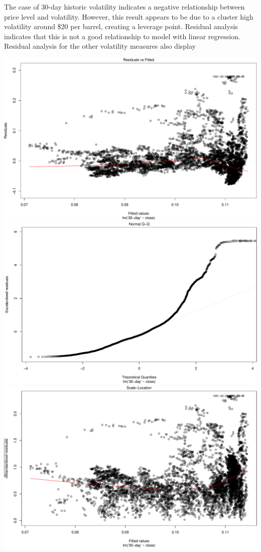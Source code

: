 \documentclass[11pt,]{article}
\makeatletter
\def\maxwidth{\ifdim\Gin@nat@width>\linewidth\linewidth
\else\Gin@nat@width\fi}
\let\Oldincludegraphics\includegraphics
\renewcommand{\includegraphics}[1]{\Oldincludegraphics[width=\maxwidth]{#1}}
\makeatother
\begin{document}
The case of 30-day historic volatility indicates a negative relationship
between price level and volatility. However, this result appears to be
due to a cluster high volatility around \$20 per barrel, creating a
leverage point. Residual analysis indicates that this is not a good
relationship to model with linear regression. Residual analysis for the
other volatility measures also display

\includegraphics{Figs/unnamed-chunk-10-1.pdf}
\includegraphics{Figs/unnamed-chunk-10-2.pdf}
\includegraphics{Figs/unnamed-chunk-10-3.pdf}
\end{document}
